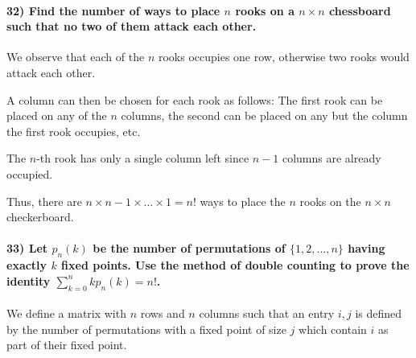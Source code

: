 \documentclass[
]{article}
\begin{document}
\hypertarget{find-the-number-of-ways-to-place-n-rooks-on-a-n-times-n-chessboard-such-that-no-two-of-them-attack-each-other.}{%
\paragraph{\texorpdfstring{32) Find the number of ways to place \(n\)
rooks on a \(n \times n\) chessboard such that no two of them attack
each
other.}{32) Find the number of ways to place n rooks on a n \textbackslash times n chessboard such that no two of them attack each other.}}\label{find-the-number-of-ways-to-place-n-rooks-on-a-n-times-n-chessboard-such-that-no-two-of-them-attack-each-other.}}

We observe that each of the \(n\) rooks occupies one row, otherwise two
rooks would attack each other.

A column can then be chosen for each rook as follows: The first rook can
be placed on any of the \(n\) columns, the second can be placed on any
but the column the first rook occupies, etc.

The \(n\)-th rook has only a single column left since \(n-1\) columns
are already occupied.

Thus, there are \(n \times n-1 \times \dots \times 1 = n!\) ways to
place the \(n\) rooks on the \(n \times n\) checkerboard.

\hypertarget{let-p_nk-be-the-number-of-permutations-of-12-dots-n-having-exactly-k-fixed-points.-use-the-method-of-double-counting-to-prove-the-identity-sum_k0n-kp_nk-n.}{%
\paragraph{\texorpdfstring{33) Let \(p_n(k)\) be the number of
permutations of \(\{1,2, \dots, n\}\) having exactly \(k\) fixed points.
Use the method of double counting to prove the identity
\(\sum_{k=0}^n kp_n(k) = n!\).}{33) Let p\_n(k) be the number of permutations of \textbackslash\{1,2, \textbackslash dots, n\textbackslash\} having exactly k fixed points. Use the method of double counting to prove the identity \textbackslash sum\_\{k=0\}\^{}n kp\_n(k) = n!.}}\label{let-p_nk-be-the-number-of-permutations-of-12-dots-n-having-exactly-k-fixed-points.-use-the-method-of-double-counting-to-prove-the-identity-sum_k0n-kp_nk-n.}}

We define a matrix with \(n\) rows and \(n\) columns such that an entry
\(i,j\) is defined by the number of permutations with a fixed point of
size \(j\) which contain \(i\) as part of their fixed point.
\end{document}
